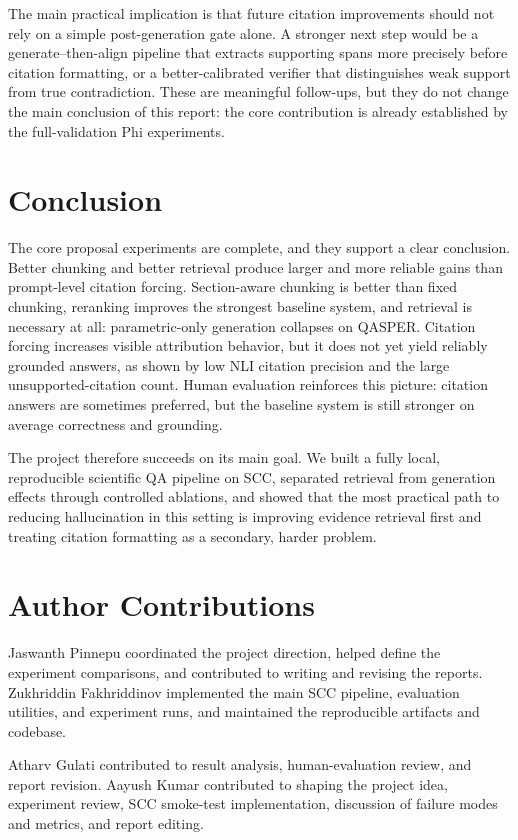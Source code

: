 \documentclass[11pt]{article}
\begin{document}
The main practical implication is that future citation improvements should not rely on a simple post-generation gate alone. A stronger next step would be a generate--then-align pipeline that extracts supporting spans more precisely before citation formatting, or a better-calibrated verifier that distinguishes weak support from true contradiction. These are meaningful follow-ups, but they do not change the main conclusion of this report: the core contribution is already established by the full-validation Phi experiments.

\section{Conclusion}

The core proposal experiments are complete, and they support a clear conclusion. Better chunking and better retrieval produce larger and more reliable gains than prompt-level citation forcing. Section-aware chunking is better than fixed chunking, reranking improves the strongest baseline system, and retrieval is necessary at all: parametric-only generation collapses on QASPER. Citation forcing increases visible attribution behavior, but it does not yet yield reliably grounded answers, as shown by low NLI citation precision and the large unsupported-citation count. Human evaluation reinforces this picture: citation answers are sometimes preferred, but the baseline system is still stronger on average correctness and grounding.

The project therefore succeeds on its main goal. We built a fully local, reproducible scientific QA pipeline on SCC, separated retrieval from generation effects through controlled ablations, and showed that the most practical path to reducing hallucination in this setting is improving evidence retrieval first and treating citation formatting as a secondary, harder problem.

\section*{Author Contributions}

Jaswanth Pinnepu coordinated the project direction, helped define the experiment comparisons, and contributed to writing and revising the reports. Zukhriddin Fakhriddinov implemented the main SCC pipeline, evaluation utilities, and experiment runs, and maintained the reproducible artifacts and codebase.

Atharv Gulati contributed to result analysis, human-evaluation review, and report revision. Aayush Kumar contributed to shaping the project idea, experiment review, SCC smoke-test implementation, discussion of failure modes and metrics, and report editing.

{\small


}
\end{document}
